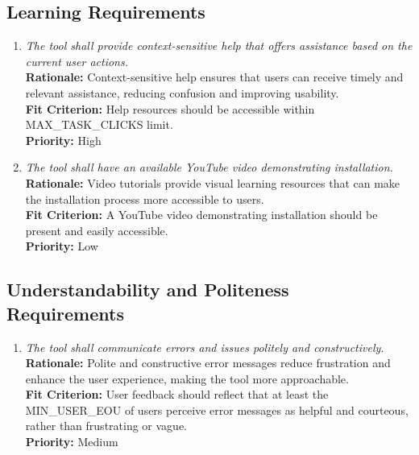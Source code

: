 \documentclass[12pt]{article}
\begin{document}
\subsection{Learning Requirements}
\begin{enumerate}[label=UHR-LRN \arabic*., wide=0pt, leftmargin=*]
  \item \emph{The tool shall provide context-sensitive help that
    offers assistance based on the current user actions.}\\[2mm]
    {\bf Rationale:} Context-sensitive help ensures that users can
    receive timely and relevant assistance, reducing confusion and
    improving usability.\\
    {\bf Fit Criterion:} Help resources should be accessible within
    MAX\_TASK\_CLICKS limit.\\
    {\bf Priority:} High
  \item \emph{The tool shall have an available YouTube video
    demonstrating installation.}\\[2mm]
    {\bf Rationale:} Video tutorials provide visual learning
    resources that can make the installation process more accessible to users.\\
    {\bf Fit Criterion:} A YouTube video demonstrating installation
    should be present and easily accessible.\\
    {\bf Priority:} Low
\end{enumerate}

\subsection{Understandability and Politeness Requirements}
\begin{enumerate}[label=UHR-UPL \arabic*., wide=0pt, leftmargin=*]
  \item \emph{The tool shall communicate errors and issues politely
    and constructively.}\\[2mm]
    {\bf Rationale:} Polite and constructive error messages reduce
    frustration and enhance the user experience, making the tool more
    approachable.\\
    {\bf Fit Criterion:} User feedback should reflect that at least
    the MIN\_USER\_EOU of users perceive error messages as helpful
    and courteous, rather than frustrating or vague.\\
    {\bf Priority:} Medium
\end{enumerate}
\end{document}
